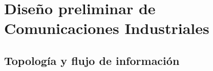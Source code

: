 \section{Diseño preliminar de Comunicaciones Industriales}\label{sec:comunicaciones}

\subsection{Topología y flujo de información}

